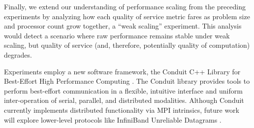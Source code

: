 Finally, we extend our understanding of performance scaling from the preceding experiments by analyzing how each quality of service metric fares as problem size and processor count grow together, a ``weak scaling'' experiment.
This analysis would detect a scenario where raw performance remains stable under weak scaling, but quality of service (and, therefore, potentially quality of computation) degrades.

Experiments employ a new software framework, the Conduit C++ Library for Best-Effort High Performance Computing \citep{moreno2021conduit}.
The Conduit library provides tools to perform best-effort communication in a flexible, intuitive interface and uniform inter-operation of serial, parallel, and distributed modalities.
Although Conduit currently implements distributed functionality via MPI intrinsics, future work will explore lower-level protocols like InfiniBand Unreliable Datagrams \citep{kashyap2006ip, koop2007high}.
